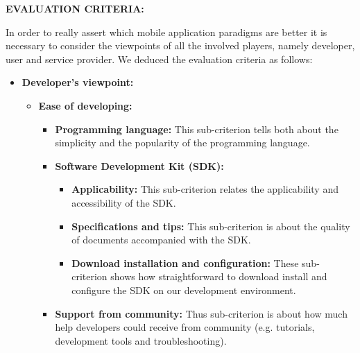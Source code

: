 \noindent\textbf{EVALUATION CRITERIA:}

\noindent In order to really assert which mobile application paradigms are better it is necessary to consider the viewpoints of all the involved players, namely developer, user and service provider. We deduced the evaluation criteria as follows:

\begin{itemize}
    \item\textbf{Developer's viewpoint:}

    \begin{itemize}
        \item \textbf{Ease of developing:}
        
            \begin{itemize}
                \item \textbf{Programming language:} This sub-criterion tells both about the simplicity and the popularity of the programming language.
                \item \textbf{Software Development Kit (SDK):}
                
                    \begin{itemize}
                        \item \textbf{Applicability:} This sub-criterion relates the applicability and accessibility of the SDK.
                                \item \textbf{Specifications and tips: }This sub-criterion is about the quality of documents accompanied with the SDK.
                                \item \textbf{Download installation and configuration:} These sub-criterion shows how straightforward to download install and configure the SDK on our development environment.
                            \end{itemize}
                            
                            \item\textbf{Support from community:} Thus sub-criterion is about how much help developers could receive from community (e.g. tutorials, development tools and troubleshooting).
                        \end{itemize}
                        

\end{itemize}
\end{itemize}
